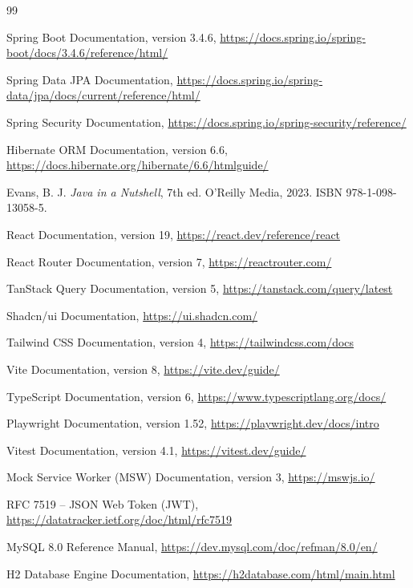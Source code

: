 \newpage
\begin{thebibliography}{99}

Spring Boot Documentation, version 3.4.6,
\url{https://docs.spring.io/spring-boot/docs/3.4.6/reference/html/}

Spring Data JPA Documentation,
\url{https://docs.spring.io/spring-data/jpa/docs/current/reference/html/}

Spring Security Documentation,
\url{https://docs.spring.io/spring-security/reference/}

Hibernate ORM Documentation, version 6.6,
\url{https://docs.hibernate.org/hibernate/6.6/htmlguide/}

Evans, B. J. \textit{Java in a Nutshell}, 7th ed. O'Reilly Media, 2023. ISBN 978-1-098-13058-5.

React Documentation, version 19,
\url{https://react.dev/reference/react}

React Router Documentation, version 7,
\url{https://reactrouter.com/}

TanStack Query Documentation, version 5,
\url{https://tanstack.com/query/latest}

Shadcn/ui Documentation,
\url{https://ui.shadcn.com/}

Tailwind CSS Documentation, version 4,
\url{https://tailwindcss.com/docs}

Vite Documentation, version 8,
\url{https://vite.dev/guide/}

TypeScript Documentation, version 6,
\url{https://www.typescriptlang.org/docs/}

Playwright Documentation, version 1.52,
\url{https://playwright.dev/docs/intro}

Vitest Documentation, version 4.1,
\url{https://vitest.dev/guide/}

Mock Service Worker (MSW) Documentation, version 3,
\url{https://mswjs.io/}

RFC 7519 -- JSON Web Token (JWT),
\url{https://datatracker.ietf.org/doc/html/rfc7519}

MySQL 8.0 Reference Manual,
\url{https://dev.mysql.com/doc/refman/8.0/en/}

H2 Database Engine Documentation,
\url{https://h2database.com/html/main.html}


\end{thebibliography}
